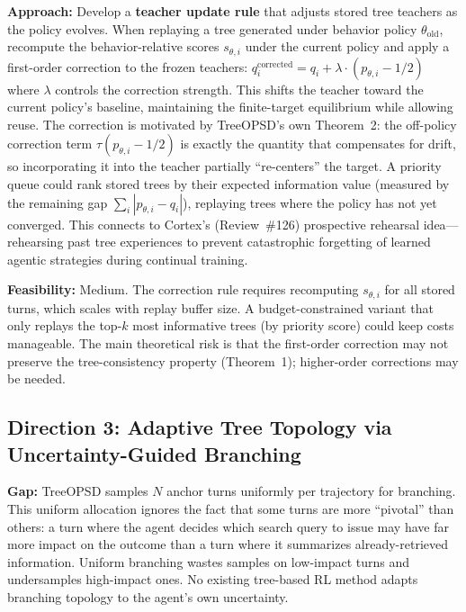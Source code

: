 \documentclass[11pt,a4paper]{article}
\begin{document}
\textbf{Approach:} Develop a \textbf{teacher update rule} that adjusts stored tree teachers as the policy evolves. When replaying a tree generated under behavior policy $\theta_{\text{old}}$, recompute the behavior-relative scores $s_{\theta,i}$ under the current policy and apply a first-order correction to the frozen teachers:
$q_i^{\text{corrected}} = q_i + \lambda \cdot (p_{\theta,i} - 1/2)$
where $\lambda$ controls the correction strength. This shifts the teacher toward the current policy's baseline, maintaining the finite-target equilibrium while allowing reuse. The correction is motivated by TreeOPSD's own Theorem~2: the off-policy correction term $\tau(p_{\theta,i} - 1/2)$ is exactly the quantity that compensates for drift, so incorporating it into the teacher partially ``re-centers'' the target. A priority queue could rank stored trees by their expected information value (measured by the remaining gap $\sum_i |p_{\theta,i} - q_i|$), replaying trees where the policy has not yet converged. This connects to Cortex's (Review~\#126) prospective rehearsal idea---rehearsing past tree experiences to prevent catastrophic forgetting of learned agentic strategies during continual training.

\textbf{Feasibility:} Medium. The correction rule requires recomputing $s_{\theta,i}$ for all stored turns, which scales with replay buffer size. A budget-constrained variant that only replays the top-$k$ most informative trees (by priority score) could keep costs manageable. The main theoretical risk is that the first-order correction may not preserve the tree-consistency property (Theorem~1); higher-order corrections may be needed.

\subsection{Direction 3: Adaptive Tree Topology via Uncertainty-Guided Branching}
\textbf{Gap:} TreeOPSD samples $N$ anchor turns uniformly per trajectory for branching. This uniform allocation ignores the fact that some turns are more ``pivotal'' than others: a turn where the agent decides which search query to issue may have far more impact on the outcome than a turn where it summarizes already-retrieved information. Uniform branching wastes samples on low-impact turns and undersamples high-impact ones. No existing tree-based RL method adapts branching topology to the agent's own uncertainty.
\end{document}
